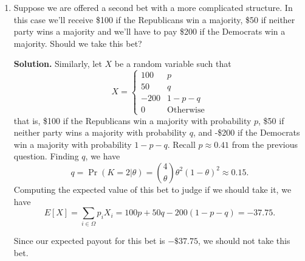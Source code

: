 \documentclass[12pt]{article}
\begin{document}
\begin{enumerate}
    \item Suppose we are offered a second bet with a more complicated structure. In this case we’ll receive \$100 if the Republicans win a majority, \$50 if neither party wins a majority and we’ll have to pay \$200 if the Democrats win a majority. Should we take this bet?

    \textbf{Solution.} Similarly, let $X$ be a random variable such that
    \[ X = \begin{cases}
        100 & p
        \\ 50 & q
        \\ -200 & 1-p-q
        \\ 0    & \text{Otherwise}
    \end{cases} \]
    that is, \$100 if the Republicans win a majority with probability $p$, \$50 if neither party wins a majority with probability $q$, and -\$200 if the Democrats win a majority with probability $1-p-q$.
    Recall $p\approx 0.41$ from the previous question. Finding $q$, we have
    \[ q=\Pr(K=2|\theta) = \binom{4}{\theta}\theta^2    (1-\theta)^{2}\approx 0.15.\]
    Computing the expected value of this bet to judge if we should take it, we have 
    \[ E[X] = \sum_{i \in \Omega} p_iX_i = 100p+50q-200(1-p-q) = -37.75. \]

    Since our expected payout for this bet is $-\$37.75$, we should not take this bet. 
\end{enumerate}
\end{document}
